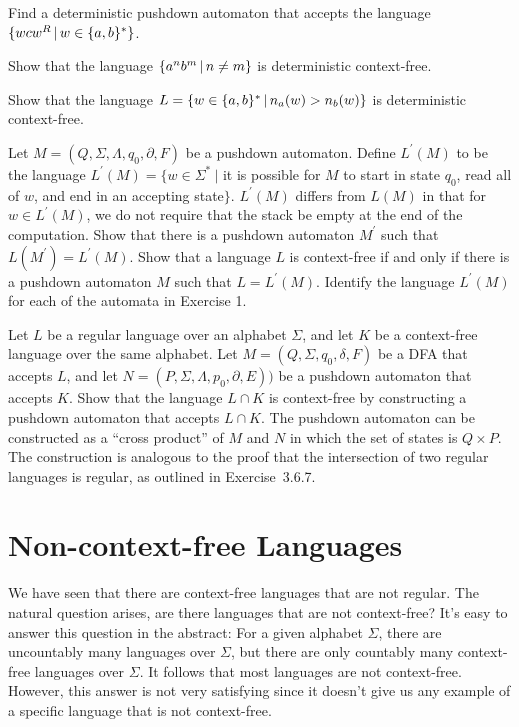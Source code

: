 \begin{exercises}
\problem Find a deterministic pushdown automaton that accepts the language $\{wcw^R\,|\, w\in\{a,b\}^*\}$.

\problem Show that the language $\{a^nb^m\,|\, n\not=m\}$ is deterministic context-free.

\problem Show that the language $L=\{w\in\{a,b\}^*\,|\, n_a(w) > n_b(w)\}$ is deterministic context-free.

\problem Let $M=(Q,\Sigma,\Lambda,q_0,\partial,F)$ be a pushdown automaton.  Define $L^\prime(M)$ to be 
the language $L^\prime(M)=\{w\in\Sigma^*\ |$ it is possible for $M$ to start in state $q_0$,
read all of $w$, and end in an accepting state$\}$.  $L^\prime(M)$ differs from $L(M)$ in that
for $w\in L^\prime(M)$, we do not require that the stack be empty at the end of the computation.
\ppart Show that there is a pushdown automaton $M^\prime$ such that $L(M^\prime)=L^\prime(M)$.
\ppart Show that a language $L$ is context-free if and only if there is a pushdown automaton
$M$ such that $L=L^\prime(M)$.
\ppart Identify the language $L^\prime(M)$ for each of the automata in Exercise 1.

\problem Let $L$ be a regular language over an alphabet $\Sigma$, and let $K$
be a context-free language over the same alphabet.  Let $M=(Q,\Sigma,q_0,\delta,F)$ be a DFA that
accepts $L$, and let $N=(P,\Sigma,\Lambda,p_0,\partial,E))$ be a pushdown automaton that accepts $K$.
Show that the language $L\cap K$ is context-free by constructing a pushdown automaton
that accepts $L\cap K$.  The pushdown automaton can be constructed as a ``cross product''
of $M$ and $N$ in which the set of states is $Q\times P$.  The construction is analogous
to the proof that the intersection of two regular languages is regular, as outlined
in Exercise~3.6.7.


\end{exercises}




\section{Non-context-free Languages}\label{S-grammars-4}

We have seen that there are context-free languages that are not
regular.  The natural question arises, are there languages that
are not context-free?  It's easy to answer this question in the
abstract:  For a given alphabet $\Sigma$, there are uncountably
many languages over $\Sigma$, but there are only
countably many context-free languages over $\Sigma$.  It follows
that most languages are not context-free.  However, this answer
is not very satisfying since it doesn't give us any example of
a specific language that is not context-free.

